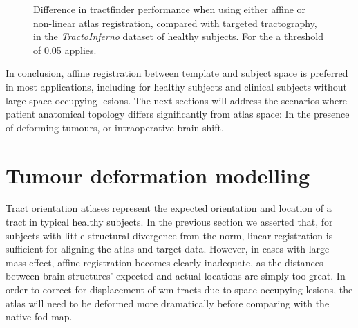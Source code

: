 \documentclass[12pt,phd,a4paper,twoside]{ucl_thesis}
\begin{document}
\begin{figure}[hbt!]
  \caption[Comparing linear and non-linear atlas registration]{Difference in tractfinder performance when using either affine or non-linear atlas registration, compared with targeted  tractography, in the \textit{TractoInferno} dataset of healthy subjects. For the  a threshold of 0.05 applies.}\label{fig:nrr}
\end{figure}

In conclusion, affine registration between template and subject space is preferred in most applications, including for healthy subjects and clinical subjects without large space-occupying lesions.
The next sections will address the scenarios where patient anatomical topology differs significantly from atlas space:
In the presence of deforming tumours, or intraoperative brain shift.
\clearpage{}
\clearpage{}\section{Tumour deformation modelling}
\label{chapterlabel3}

Tract orientation atlases represent the expected orientation and location of a tract in typical healthy subjects.
In the previous section we asserted that, for subjects with little structural divergence from the norm, linear registration is sufficient for aligning the atlas and target data.
However, in cases with large mass-effect, affine registration becomes clearly inadequate, as the distances between brain structures' expected and actual locations are simply too great.
In order to correct for displacement of \gls{wm} tracts due to space-occupying lesions, the atlas will need to be deformed more dramatically before comparing with the native \gls{fod} map.
\end{document}
